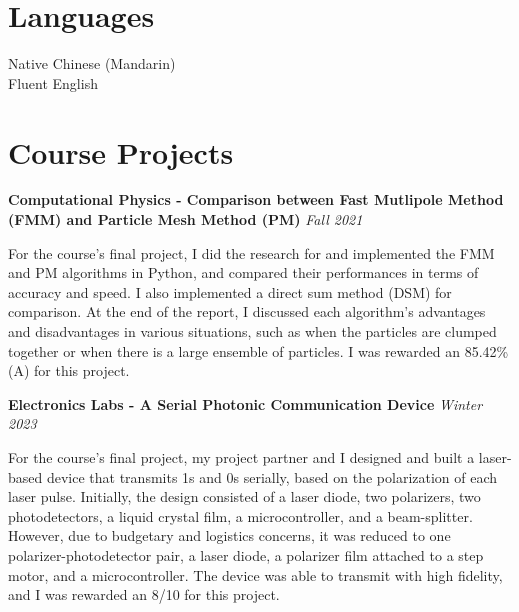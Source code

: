 \documentclass{article}
\newcommand{\cvsection}[1]{\section*{\rmfamily#1}}
\begin{document}
\cvsection{Languages}
\hspace*{2em} Native Chinese (Mandarin) \\
\hspace*{2em} Fluent English

\newpage

\cvsection{Course Projects}

\textbf{Computational Physics - Comparison between Fast Mutlipole Method (FMM) and Particle Mesh Method (PM)} \hfill \textit{Fall 2021}

For the course's final project, I did the research for and implemented the FMM and PM algorithms in Python, and compared their performances in terms of accuracy and speed. I also implemented a direct sum method (DSM) for comparison. At the end of the report, I discussed each algorithm's advantages and disadvantages in various situations, such as when the particles are clumped together or when there is a large ensemble of particles. I was rewarded an 85.42\% (A) for this project. 


\noindent\textbf{Electronics Labs - A Serial Photonic Communication Device} \hfill \textit{Winter 2023}

For the course's final project, my project partner and I designed and built a laser-based device that transmits 1s and 0s serially, based on the polarization of each laser pulse. Initially, the design consisted of a laser diode, two polarizers, two photodetectors, a liquid crystal film, a microcontroller, and a beam-splitter. However, due to budgetary and logistics concerns, it was reduced to one polarizer-photodetector pair, a laser diode, a polarizer film attached to a step motor, and a microcontroller. The device was able to transmit with high fidelity, and I was rewarded an 8/10 for this project.

\end{document}
